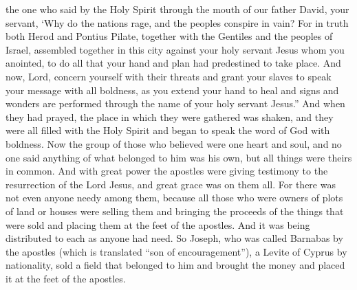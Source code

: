 \begin{biblechapter}
\verse the one who said by the Holy Spirit through the mouth of our father David, your servant,
\verse ‘Why do the nations rage, 
and the peoples conspire in vain?
\verse For in truth both Herod and Pontius Pilate, together with the Gentiles and the peoples of Israel, assembled together in this city against your holy servant Jesus whom you anointed,
\verse to do all that your hand and plan had predestined to take place.
\verse And now, Lord, concern yourself with their threats and grant your slaves to speak your message with all boldness,
\verse as you extend your hand to heal and signs and wonders are performed through the name of your holy servant Jesus.”
\verse And when they had prayed, the place in which they were gathered was shaken, and they were all filled with the Holy Spirit and began to speak the word of God with boldness.
 Now the group of those who believed were one heart and soul, and no one said anything of what belonged to him was his own, but all things were theirs in common.
\verse And with great power the apostles were giving testimony to the resurrection of the Lord Jesus, and great grace was on them all.
\verse For there was not even anyone needy among them, because all those who were owners of plots of land or houses were selling them and bringing the proceeds of the things that were sold
\verse and placing them at the feet of the apostles. And it was being distributed to each as anyone had need.
\verse So Joseph, who was called Barnabas by the apostles (which is translated “son of encouragement”), a Levite of Cyprus by nationality,
\verse sold a field that belonged to him and brought the money and placed it at the feet of the apostles.
\end{biblechapter}

